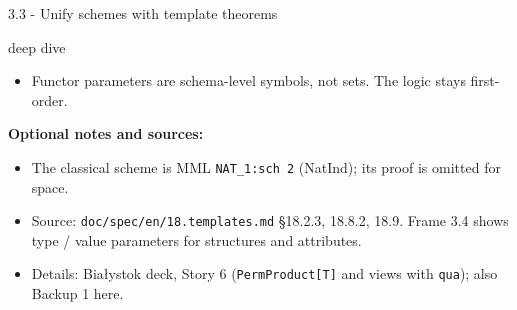 \documentclass[aspectratio=169,11pt]{beamer}
\newcommand{\deepdivetag}{\hfill\colorbox{black!15}{\textcolor{black!65}{\strut\scriptsize\sffamily deep dive}}}
\begin{document}
\begin{frame}[fragile,t]{3.3 - Unify schemes with template theorems\deepdivetag}
{\begin{itemize}
\item Functor parameters are schema-level symbols, not sets. The logic stays first-order.
\end{itemize}
\smallskip
\textbf{Optional notes and sources:}
\begin{itemize}
\setlength{\itemsep}{1pt}
\setlength{\parsep}{0pt}
\setlength{\parskip}{0pt}
\item The classical scheme is MML \texttt{NAT\_1:sch 2} (NatInd); its proof is omitted for space.
\item Source: \texttt{doc/spec/en/18.templates.md} §18.2.3, 18.8.2, 18.9. Frame 3.4 shows type / value parameters for structures and attributes.
\end{itemize}
\begin{itemize}
\setlength{\itemsep}{1pt}
\setlength{\parsep}{0pt}
\setlength{\parskip}{0pt}
\item Details: Bia\l{}ystok deck, Story 6 (\texttt{PermProduct[T]} and views with \texttt{qua}); also Backup 1 here.
\end{itemize}
}
\end{frame}
\end{document}
